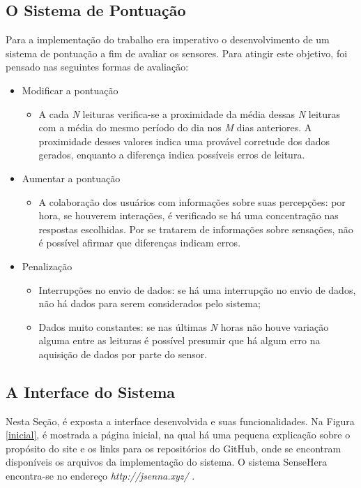 \subsection{O Sistema de Pontuação}
\label{subsec:pontuacao}
\null \quad Para a implementação do trabalho era imperativo o desenvolvimento de um sistema de pontuação a fim de avaliar os sensores. Para atingir este objetivo, foi pensado nas seguintes formas de avaliação:
\begin{itemize}
  \item Modificar a pontuação
    \begin{itemize}
      \item A cada \textit{N} leituras verifica-se a proximidade da média dessas \textit{N} leituras com a média do mesmo período do dia nos \textit{M} dias anteriores. A proximidade desses valores indica uma provável corretude dos dados gerados, enquanto a diferença indica possíveis erros de leitura.
    \end{itemize}
  \item Aumentar a pontuação
  \begin{itemize}
    \item A colaboração dos usuários com informações sobre suas percepções: por hora, se houverem interações, é verificado se há uma concentração nas respostas escolhidas. Por se tratarem de informações sobre sensações, não é possível afirmar que diferenças indicam erros.
  \end{itemize}
  \item Penalização
    \begin{itemize}
      \item Interrupções no envio de dados: se há uma interrupção no envio de dados, não há dados para serem considerados pelo sistema;
      \item Dados muito constantes: se nas últimas \textit{N} horas não houve variação alguma entre as leituras é possível presumir que há algum erro na aquisição de dados por parte do sensor.
    \end{itemize}
\end{itemize}

\subsection{A Interface do Sistema}
\null \quad Nesta Seção, é exposta a interface desenvolvida e suas funcionalidades. Na Figura \ref{inicial},
é mostrada a página inicial, na qual há uma pequena explicação sobre o propósito do site e os links para os repositórios do GitHub, onde se encontram disponíveis os arquivos da implementação do sistema. O sistema SenseHera encontra-se no endereço \textit{http://jsenna.xyz/} .

